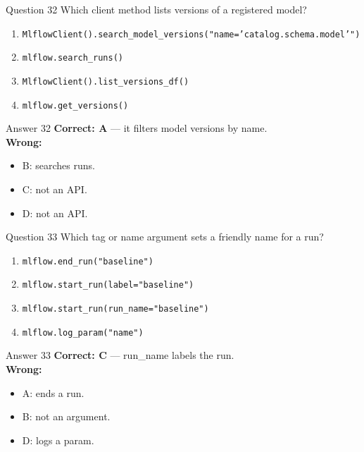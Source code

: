 \documentclass[aspectratio=169,11pt]{beamer}
\begin{document}
\begin{frame}{Question 32}
Which client method lists versions of a registered model?
\begin{enumerate}[label=\Alph*.]
\item \texttt{MlflowClient().search\_model\_versions("name='catalog.schema.model'")}
\item \texttt{mlflow.search\_runs()}
\item \texttt{MlflowClient().list\_versions\_df()}
\item \texttt{mlflow.get\_versions()}
\end{enumerate}
\end{frame}
\begin{frame}{Answer 32}
\textbf{Correct: A} --- it filters model versions by name.\\
\vspace{0.5em}
\textbf{Wrong:}
\begin{itemize}
\item B: searches runs.
\item C: not an API.
\item D: not an API.
\end{itemize}
\end{frame}

\begin{frame}{Question 33}
Which tag or name argument sets a friendly name for a run?
\begin{enumerate}[label=\Alph*.]
\item \texttt{mlflow.end\_run("baseline")}
\item \texttt{mlflow.start\_run(label="baseline")}
\item \texttt{mlflow.start\_run(run\_name="baseline")}
\item \texttt{mlflow.log\_param("name")}
\end{enumerate}
\end{frame}
\begin{frame}{Answer 33}
\textbf{Correct: C} --- run\_name labels the run.\\
\vspace{0.5em}
\textbf{Wrong:}
\begin{itemize}
\item A: ends a run.
\item B: not an argument.
\item D: logs a param.
\end{itemize}
\end{frame}
\end{document}
